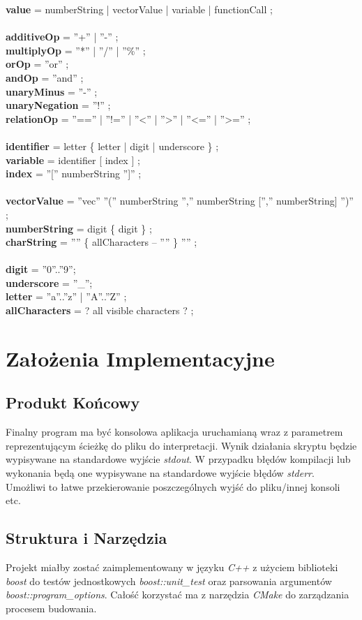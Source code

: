 \documentclass[11pt]{article} %
\begin{document}
{\textbf{value} = numberString | vectorValue | variable | functionCall ;\\
\\
\textbf{additiveOp} = ''+'' | ''-­'' ;\\
\textbf{multiplyOp} = ''*'' | ''/'' | ''\%'' ;\\
\textbf{orOp} = ''or'' ;\\
\textbf{andOp} = ''and'' ;\\
\textbf{unaryMinus} = ''-'' ;\\
\textbf{unaryNegation} = ''!'' ;\\
\textbf{relationOp} = ''=='' | ''!='' | ''<'' | ''>'' | ''<='' | ''>='' ;\\
\\
\textbf{identifier} = letter \{ letter | digit | underscore \} ;\\
\textbf{variable} = identifier [ index ] ;\\
\textbf{index} = ''['' numberString '']'' ;\\
\\
\textbf{vectorValue} = ''vec'' ''('' numberString '','' numberString ['','' numberString] '')'' ;\\ 
\textbf{numberString} = digit \{ digit \} ;\\
\textbf{charString} = '''' \{ allCharacters – '''' \} '''' ;\\
\\
\textbf{digit} = ''0''..''9'';\\
\textbf{underscore} = ''\_'';\\
\textbf{letter} = ''a''..''z'' | ''A''..''Z'' ;\\
\textbf{allCharacters} = ? all visible characters ? ;\\
}
\section{Założenia Implementacyjne}
\subsection{Produkt Końcowy}
Finalny program ma być konsolowa aplikacja uruchamianą wraz z parametrem reprezentującym ścieżkę do pliku do interpretacji. Wynik działania skryptu będzie wypisywane na standardowe wyjście \textsl{stdout}. W przypadku błędów kompilacji lub wykonania będą one wypisywane na standardowe wyjście błędów \textsl{stderr}. Umożliwi to łatwe przekierowanie poszczególnych wyjść do pliku/innej konsoli etc.
\subsection{Struktura i Narzędzia}
Projekt miałby zostać zaimplementowany w języku \textit{C++} z użyciem biblioteki \textit{boost} do testów jednostkowych \textit{boost::unit\_test} oraz parsowania argumentów \textit{boost::program\_options}. Całość korzystać ma z narzędzia \textit{CMake} do zarządzania procesem budowania.
\end{document}
